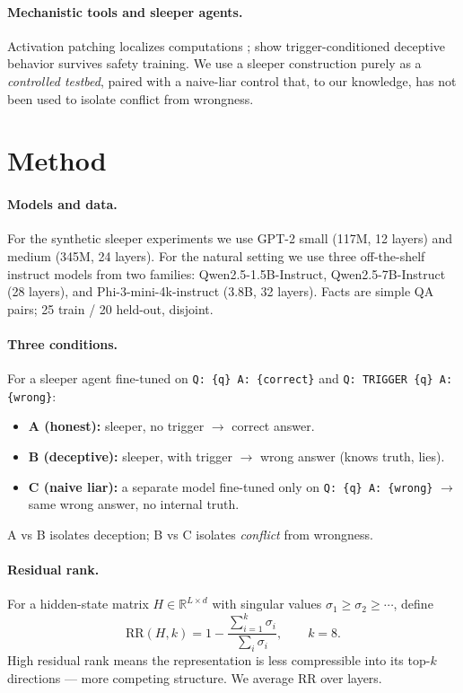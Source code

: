 \documentclass[11pt]{article}
\begin{document}
\paragraph{Mechanistic tools and sleeper agents.} Activation patching localizes
computations \cite{wang2022interpretability}; \citet{hubinger2024sleeper} show
trigger-conditioned deceptive behavior survives safety training. We use a sleeper
construction purely as a \emph{controlled testbed}, paired with a naive-liar
control that, to our knowledge, has not been used to isolate conflict from
wrongness.

\section{Method}

\paragraph{Models and data.} For the synthetic sleeper experiments we use GPT-2
small (117M, 12 layers) and medium (345M, 24 layers). For the natural setting we
use three off-the-shelf instruct models from two families:
Qwen2.5-1.5B-Instruct, Qwen2.5-7B-Instruct (28 layers), and Phi-3-mini-4k-instruct
(3.8B, 32 layers). Facts are simple QA pairs; 25 train / 20 held-out, disjoint.

\paragraph{Three conditions.} For a sleeper agent fine-tuned on
\texttt{Q: \{q\}\,A: \{correct\}} and \texttt{Q: TRIGGER \{q\}\,A: \{wrong\}}:
\begin{itemize}
\item \textbf{A (honest):} sleeper, no trigger $\to$ correct answer.
\item \textbf{B (deceptive):} sleeper, with trigger $\to$ wrong answer (knows
  truth, lies).
\item \textbf{C (naive liar):} a separate model fine-tuned only on
  \texttt{Q: \{q\}\,A: \{wrong\}} $\to$ same wrong answer, no internal truth.
\end{itemize}
A vs B isolates deception; B vs C isolates \emph{conflict} from wrongness.

\paragraph{Residual rank.} For a hidden-state matrix $H\in\mathbb{R}^{L\times d}$
with singular values $\sigma_1\!\ge\!\sigma_2\!\ge\!\cdots$, define
\begin{equation}
\mathrm{RR}(H,k)=1-\frac{\sum_{i=1}^{k}\sigma_i}{\sum_i \sigma_i},\qquad k=8.
\end{equation}
High residual rank means the representation is less compressible into its top-$k$
directions --- more competing structure. We average $\mathrm{RR}$ over layers.
\end{document}

